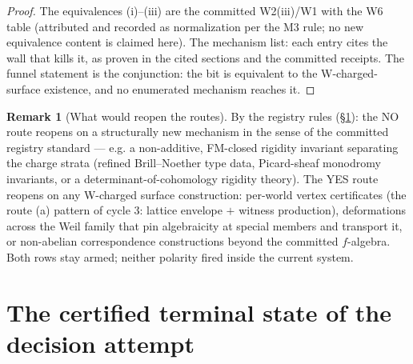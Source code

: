 \documentclass[11pt]{article}
\theoremstyle{definition}
\newtheorem{remark}[theorem]{Remark}
\begin{document}
\begin{proof}
The equivalences (i)--(iii) are the committed W2(iii)/W1 with the W6 table
(attributed and recorded as normalization per the M3 rule; no new equivalence
content is claimed here). The mechanism list: each entry cites the wall that
kills it, as proven in the cited sections and the committed receipts. The
funnel statement is the conjunction: the bit is equivalent to the
W-charged-surface existence, and no enumerated mechanism reaches it.
\end{proof}

\begin{remark}[What would reopen the routes]
By the registry rules (\S\ref{sec:terminal}): the NO route reopens on a
structurally new mechanism in the sense of the committed registry standard --- e.g.
a non-additive, FM-closed rigidity invariant separating the charge strata
(refined Brill--Noether type data, Picard-sheaf monodromy invariants, or a
determinant-of-cohomology rigidity theory). The YES route reopens on any
W-charged surface construction: per-world vertex certificates (the route (a)
pattern of cycle $3$: lattice envelope $+$ witness production), deformations
across the Weil family that pin algebraicity at special members and transport
it, or non-abelian correspondence constructions beyond the committed
$f$-algebra. Both rows stay armed; neither polarity fired inside the current
system.
\end{remark}

\section{The certified terminal state of the decision attempt}\label{sec:terminal}
\end{document}
